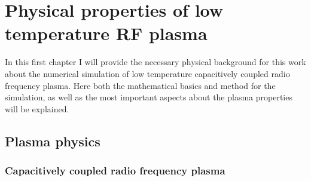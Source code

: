 \chapter{Physical properties of low temperature RF plasma}

  In this first chapter I will provide the necessary physical background 
  for this work about the numerical simulation of low temperature 
  capacitively coupled radio frequency plasma. Here both the mathematical 
  basics and method for the simulation, as well as the most important aspects
  about the plasma properties will be explained.

  \section{Plasma physics}

    \subsection{Capacitively coupled radio frequency plasma}

